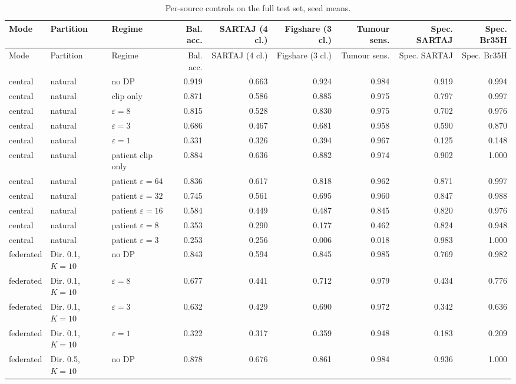 {\scriptsize
\begin{longtable}{lllrrrrrr}
\caption{Per-source controls on the full test set, seed means.}\label{tab:s_sources}\\
\toprule
Mode & Partition & Regime & Bal. acc. & SARTAJ (4 cl.) & Figshare (3 cl.) & Tumour sens. & Spec. SARTAJ & Spec. Br35H \\
\midrule
\endfirsthead
\toprule
Mode & Partition & Regime & Bal. acc. & SARTAJ (4 cl.) & Figshare (3 cl.) & Tumour sens. & Spec. SARTAJ & Spec. Br35H \\
\midrule
\endhead
\bottomrule
\endlastfoot
central & natural & no DP & 0.919 & 0.663 & 0.924 & 0.984 & 0.919 & 0.994 \\
central & natural & clip only & 0.871 & 0.586 & 0.885 & 0.975 & 0.797 & 0.997 \\
central & natural & $\varepsilon=8$ & 0.815 & 0.528 & 0.830 & 0.975 & 0.702 & 0.976 \\
central & natural & $\varepsilon=3$ & 0.686 & 0.467 & 0.681 & 0.958 & 0.590 & 0.870 \\
central & natural & $\varepsilon=1$ & 0.331 & 0.326 & 0.394 & 0.967 & 0.125 & 0.148 \\
central & natural & patient clip only & 0.884 & 0.636 & 0.882 & 0.974 & 0.902 & 1.000 \\
central & natural & patient $\varepsilon=64$ & 0.836 & 0.617 & 0.818 & 0.962 & 0.871 & 0.997 \\
central & natural & patient $\varepsilon=32$ & 0.745 & 0.561 & 0.695 & 0.960 & 0.847 & 0.988 \\
central & natural & patient $\varepsilon=16$ & 0.584 & 0.449 & 0.487 & 0.845 & 0.820 & 0.976 \\
central & natural & patient $\varepsilon=8$ & 0.353 & 0.290 & 0.177 & 0.462 & 0.824 & 0.948 \\
central & natural & patient $\varepsilon=3$ & 0.253 & 0.256 & 0.006 & 0.018 & 0.983 & 1.000 \\
federated & Dir. 0.1, $K{=}10$ & no DP & 0.843 & 0.594 & 0.845 & 0.985 & 0.769 & 0.982 \\
federated & Dir. 0.1, $K{=}10$ & $\varepsilon=8$ & 0.677 & 0.441 & 0.712 & 0.979 & 0.434 & 0.776 \\
federated & Dir. 0.1, $K{=}10$ & $\varepsilon=3$ & 0.632 & 0.429 & 0.690 & 0.972 & 0.342 & 0.636 \\
federated & Dir. 0.1, $K{=}10$ & $\varepsilon=1$ & 0.322 & 0.317 & 0.359 & 0.948 & 0.183 & 0.209 \\
federated & Dir. 0.5, $K{=}10$ & no DP & 0.878 & 0.676 & 0.861 & 0.984 & 0.936 & 1.000 \\

\end{longtable}}
